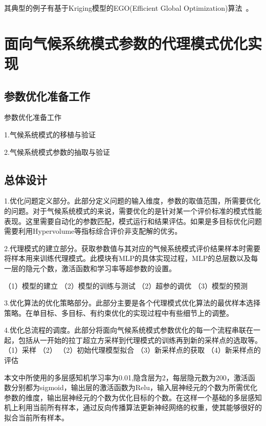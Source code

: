 其典型的例子有基于Kriging模型的EGO(Efficient
Global Optimization)算法~\cite{mohammadi2016kriging}。



\section{面向气候系统模式参数的代理模式优化实现}
\subsection{参数优化准备工作}

参数优化准备工作

1.气候系统模式的移植与验证

2.气候系统模式参数的抽取与验证

\subsection{总体设计}
1.优化问题定义部分。此部分定义问题的输入维度，参数的取值范围，所需要优化的问题。对于气候系统模式的来说，需要优化的是针对某一个评价标准的模式性能表现。这里需要自动化的参数匹配，模式运行和结果评估。如果是多目标优化问题需要利用Hypervolume等指标综合评价非支配解的优劣。

2.代理模式的建立部分。获取参数值与其对应的气候系统模式评价结果样本时需要将样本用来训练代理模式。此模块有MLP的具体实现过程，MLP的总层数以及每一层的隐元个数，激活函数和学习率等超参数的设置。

（1）模型的建立
（2）模型的训练与测试
（2）超参的调优
（3）模型的预测

3.优化算法的优化策略部分。此部分主要是各个代理模式优化算法的最优样本选择策略。在单目标、多目标、有约束优化的实现过程中有些细节上的调整。

4.优化总流程的调度。此部分将面向气候系统模式参数优化的每一个流程串联在一起，包括从一开始的拉丁超立方采样到代理模式的训练再到新的采样点的选取等。
（1）采样
（2）
（2）初始代理模型拟合
（3）新采样点的获取
（4）新采样点的评估

本文中所使用的多层感知机学习率为0.01,隐含层为2，每层隐元数为200，激活函数分别都为sigmoid，输出层的激活函数为Relu，输入层神经元的个数为所需优化参数的维度，输出层神经元的个数为优化目标的个数。在这样一个基础的多层感知机上利用当前所有样本，通过反向传播算法更新神经网络的权重，使其能够很好的拟合当前所有样本。

